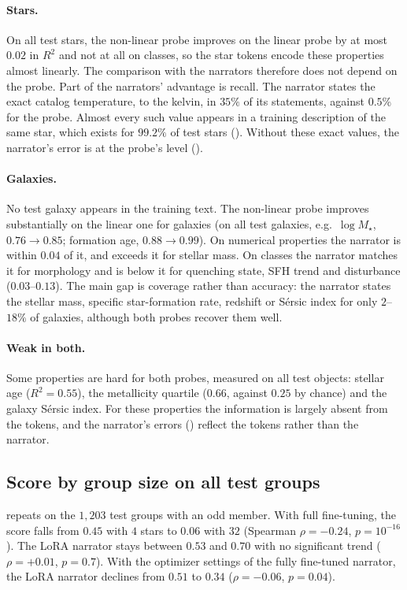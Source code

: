 \paragraph{Stars.} On all test stars, the non-linear probe improves on the linear probe by at
most $0.02$ in $R^2$ and not at all on classes, so the star tokens encode these properties almost linearly.
The comparison with the narrators therefore does not depend on the probe. Part of the
narrators' advantage is recall. The narrator states the exact catalog temperature, to the
kelvin, in $35\%$ of its statements, against $0.5\%$ for the probe. Almost every such value
appears in a training description of the same star, which exists for $99.2\%$ of test stars
(). Without these exact values, the narrator's error is at the probe's level
().

\paragraph{Galaxies.} No test galaxy appears in the training text. The non-linear probe
improves substantially on the linear one for galaxies (on all test galaxies, e.g.\
$\log M_\star$, $0.76 \to 0.85$; formation age, $0.88 \to 0.99$). On numerical properties the narrator is within $0.04$ of it,
and exceeds it for stellar mass. On classes the narrator matches it for morphology and is
below it for quenching state, SFH trend and disturbance ($0.03$--$0.13$). The
main gap is coverage rather than accuracy: the narrator states the stellar mass, specific
star-formation rate, redshift or S\'ersic index for only $2$--$18\%$ of galaxies, although
both probes recover them well.

\paragraph{Weak in both.} Some properties are hard for both probes, measured on all test objects:
stellar age ($R^2=0.55$), the metallicity quartile ($0.66$, against $0.25$ by chance) and the galaxy S\'ersic index. For
these properties the information is largely absent from the tokens, and the narrator's errors
(\Cref{fig:perprop}) reflect the tokens rather than the narrator.

\subsection{Score by group size on all test groups}\label{app:groupsize}
\Cref{fig:groupsize_test} repeats \Cref{fig:groupsize} on the $1{,}203$ test groups with an odd
member. With full fine-tuning, the score falls from $0.45$ with $4$ stars to $0.06$ with $32$
(Spearman $\rho=-0.24$, $p=10^{-16}$). The LoRA narrator stays between $0.53$ and $0.70$ with no
significant trend ($\rho=+0.01$, $p=0.7$). With the optimizer settings of the fully fine-tuned
narrator, the LoRA narrator declines from $0.51$ to $0.34$ ($\rho=-0.06$, $p=0.04$).


